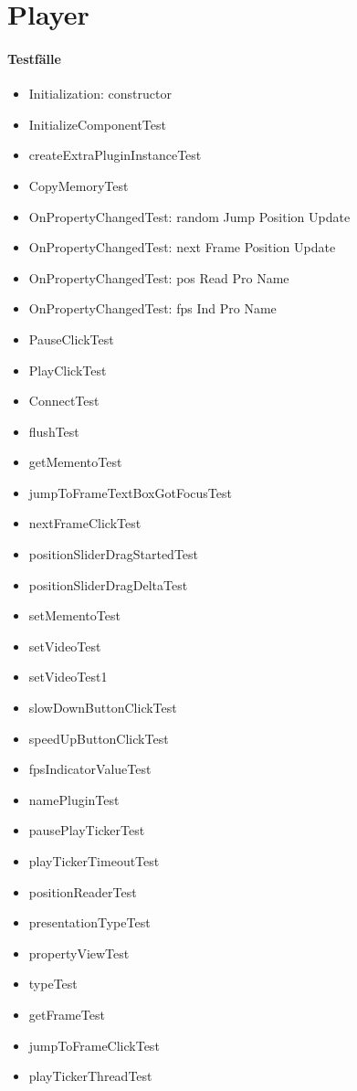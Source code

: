 \section{Player}
\paragraph*{Testfälle}
\begin{itemize}
\item Initialization: constructor
\item InitializeComponentTest
\item createExtraPluginInstanceTest
\item CopyMemoryTest
\item OnPropertyChangedTest: random Jump Position Update
\item OnPropertyChangedTest: next Frame Position Update
\item OnPropertyChangedTest: pos Read Pro Name
\item OnPropertyChangedTest: fps Ind Pro Name
\item PauseClickTest
\item PlayClickTest
\item ConnectTest
\item flushTest
\item getMementoTest
\item jumpToFrameTextBoxGotFocusTest
\item nextFrameClickTest
\item positionSliderDragStartedTest
\item positionSliderDragDeltaTest
\item setMementoTest
\item setVideoTest
\item setVideoTest1
\item slowDownButtonClickTest
\item speedUpButtonClickTest
\item fpsIndicatorValueTest
\item namePluginTest
\item pausePlayTickerTest
\item playTickerTimeoutTest
\item positionReaderTest
\item presentationTypeTest
\item propertyViewTest
\item typeTest
\item getFrameTest
\item jumpToFrameClickTest
\item playTickerThreadTest
\end{itemize}

